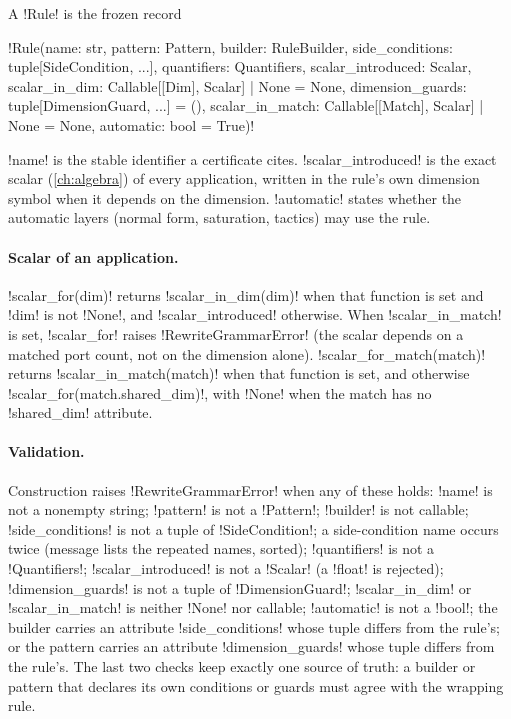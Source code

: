 \begin{definition}[Rule]\label{def:rewriting-rulerecord}
A \py!Rule! is the frozen record
\begin{signature}
\py!Rule(name: str, pattern: Pattern, builder: RuleBuilder, side_conditions: tuple[SideCondition, ...], quantifiers: Quantifiers, scalar_introduced: Scalar, scalar_in_dim: Callable[[Dim], Scalar] | None = None, dimension_guards: tuple[DimensionGuard, ...] = (), scalar_in_match: Callable[[Match], Scalar] | None = None, automatic: bool = True)!
\end{signature}
\py!name! is the stable identifier a certificate cites. \py!scalar_introduced! is the exact scalar
(\cref{ch:algebra}) of every application, written in the rule's own dimension symbol when it
depends on the dimension. \py!automatic! states whether the automatic layers (normal form,
saturation, tactics) may use the rule.
\end{definition}

\paragraph{Scalar of an application.}
\py!scalar_for(dim)! returns \py!scalar_in_dim(dim)! when that function is set and \py!dim! is not
\py!None!, and \py!scalar_introduced! otherwise. When \py!scalar_in_match! is set, \py!scalar_for!
raises \py!RewriteGrammarError! (the scalar depends on a matched port count, not on the dimension
alone). \py!scalar_for_match(match)! returns \py!scalar_in_match(match)! when that function is set,
and otherwise \py!scalar_for(match.shared_dim)!, with \py!None! when the match has no
\py!shared_dim! attribute.

\paragraph{Validation.}
Construction raises \py!RewriteGrammarError! when any of these holds:
\py!name! is not a nonempty string; \py!pattern! is not a \py!Pattern!; \py!builder! is not
callable; \py!side_conditions! is not a tuple of \py!SideCondition!; a side-condition name occurs
twice (message lists the repeated names, sorted); \py!quantifiers! is not a \py!Quantifiers!;
\py!scalar_introduced! is not a \py!Scalar! (a \py!float! is rejected); \py!dimension_guards! is not
a tuple of \py!DimensionGuard!; \py!scalar_in_dim! or \py!scalar_in_match! is neither \py!None! nor
callable; \py!automatic! is not a \py!bool!; the builder carries an attribute
\py!side_conditions! whose tuple differs from the rule's; or the pattern carries an attribute
\py!dimension_guards! whose tuple differs from the rule's. The last two checks keep exactly one
source of truth: a builder or pattern that declares its own conditions or guards must agree with
the wrapping rule.

